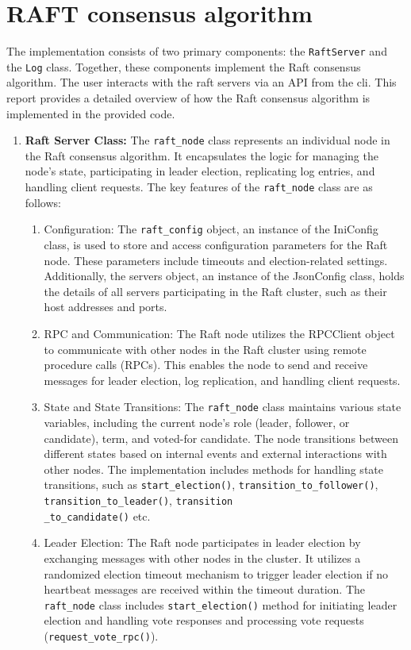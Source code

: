 \documentclass{article}
\begin{document}
\section{RAFT consensus algorithm}
The implementation consists of two primary components: the \texttt{RaftServer} and 
the \texttt{Log} class. Together, these components implement the Raft consensus 
algorithm. The user interacts with the raft servers via an API from the cli. This report provides a detailed overview of 
how the Raft consensus algorithm is implemented in the provided code.

\begin{enumerate}
	\item \textbf{Raft Server Class:}
	The \texttt{raft\_node} class represents an individual node in the Raft consensus algorithm. It encapsulates the logic for managing the node's state, participating in leader election, replicating log entries, and handling client requests. The key features of the \texttt{raft\_node} class are as follows:
	\begin{enumerate}
		\item Configuration: The \texttt{raft\_config} object, an instance of the IniConfig class, is used to store and access configuration parameters for the Raft node. These parameters include timeouts and election-related settings. Additionally, the servers object, an instance of the JsonConfig class, holds the details of all servers participating in the Raft cluster, such as their host addresses and ports.
		\item RPC and Communication: The Raft node utilizes the RPCClient object to communicate with other nodes in the Raft cluster using remote procedure calls (RPCs). This enables the node to send and receive messages for leader election, log replication, and handling client requests.
		\item State and State Transitions: The \texttt{raft\_node} class maintains various state variables, including the current node's role (leader, follower, or candidate), term, and voted-for candidate. The node transitions between different states based on internal events and external interactions with other nodes. The implementation includes methods for handling state transitions, such as \texttt{start\_election()}, \texttt{transition\_to\_follower()}, \texttt{transition\_to\_leader()}, \texttt{transition\\\_to\_candidate()} etc.
		\item Leader Election: The Raft node participates in leader election by exchanging messages with other nodes in the cluster. It utilizes a randomized election timeout mechanism to trigger leader election if no heartbeat messages are received within the timeout duration. The \texttt{raft\_node} class includes \texttt{start\_election()} method for initiating leader election and handling vote responses and processing vote requests (\texttt{request\_vote\_rpc()}).

\end{enumerate}
\end{enumerate}
\end{document}

